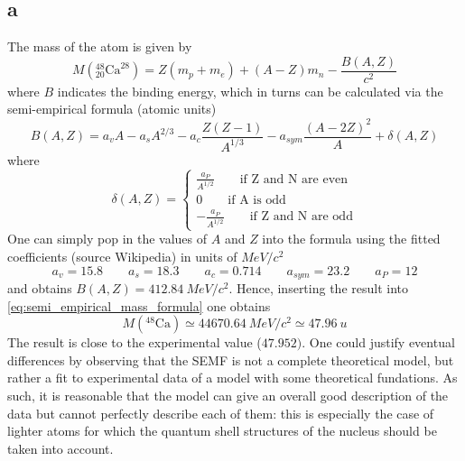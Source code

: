 \subsection*{a}
The mass of the atom is given by
\begin{equation*}
    M(^{48}_{20}\text{Ca}^{28}) = Z(m_p + m_e) + (A-Z)m_n - \frac{B(A, Z)}{c^2}
    \label{eq:semi_empirical_mass_formula}
\end{equation*}
where $B$ indicates the binding energy, which in turns can be calculated via the semi-empirical formula (atomic units)
\begin{equation}
    B(A, Z)= a_v A - a_s A^{2/3} - a_c \frac{Z(Z-1)}{A^{1/3}} - a_{sym} \frac{(A - 2Z)^2}{A} + \delta (A, Z)
    \label{eq:semi_empirical_BE_formula}
\end{equation}
where 
\begin{equation*}
    \delta(A, Z) = 
    \begin{cases}
        \frac{a_P}{A^{1/2}} \qquad \text{if Z and N are even} \\
        0 \qquad \text{if A is odd} \\
        -\frac{a_P}{A^{1/2}} \qquad \text{if Z and N are odd} 
    \end{cases}
\end{equation*}
One can simply pop in the values of $A$ and $Z$ into the formula using the fitted coefficients (source Wikipedia) in units of $MeV/c^2$
\begin{equation*}
    a_v = 15.8 \qquad a_s = 18.3 \qquad a_c = 0.714 \qquad a_{sym} = 23.2 \qquad a_P = 12
\end{equation*}
and obtains $B(A, Z) = 412.84~MeV/c^2$. Hence, inserting the result into \ref{eq:semi_empirical_mass_formula} one obtains
\begin{equation*}
    M(^{48}\text{Ca}) \simeq 44670.64~MeV/c^2 \simeq 47.96~u
\end{equation*}
The result is close to the experimental value ($47.952)$. One could justify eventual differences by observing that the SEMF is 
not a complete theoretical model, but rather a fit to experimental data of a model with some theoretical fundations. As such, it is reasonable that the model
can give an overall good description of the data but cannot perfectly describe each of them: this is especially the case of lighter atoms for which
the quantum shell structures of the nucleus should be taken into account.

